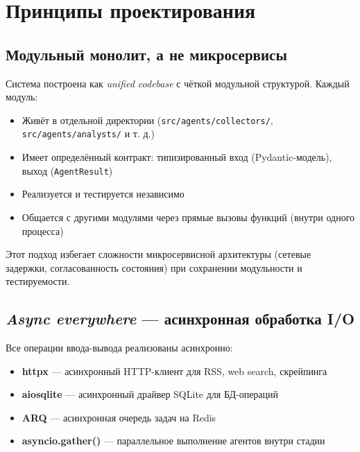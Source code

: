 \section{Принципы проектирования}

\label{sec:design_principles}


\subsection{Модульный монолит, а не микросервисы}

Система построена как \emph{unified codebase} с чёткой модульной структурой. Каждый модуль:

\begin{itemize}[nosep]
\item Живёт в отдельной директории (\texttt{src/agents/collectors/}, \texttt{src/agents/analysts/} и т. д.)
\item Имеет определённый контракт: типизированный вход (Pydantic-модель), выход (\texttt{AgentResult})
\item Реализуется и тестируется независимо
\item Общается с другими модулями через прямые вызовы функций (внутри одного процесса)
\end{itemize}

\noindent Этот подход избегает сложности микросервисной архитектуры (сетевые задержки, согласованность состояния) при сохранении модульности и тестируемости.

\subsection{\emph{Async everywhere} — асинхронная обработка I/O}


Все операции ввода-вывода реализованы асинхронно:

\begin{itemize}[nosep]
\item \textbf{httpx} — асинхронный HTTP-клиент для RSS, web search, скрейпинга
\item \textbf{aiosqlite} — асинхронный драйвер SQLite для БД-операций
\item \textbf{ARQ} — асинхронная очередь задач на Redis
\item \textbf{asyncio.gather()} — параллельное выполнение агентов внутри стадии
\end{itemize}

